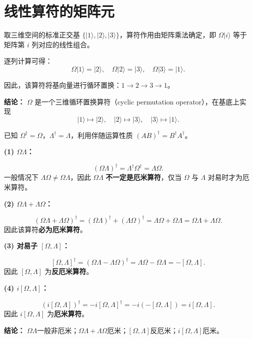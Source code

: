﻿%
\section{线性算符的矩阵元}

\begin{solution}[线性算符矩阵表示的作用]

\answer
取三维空间的标准正交基 $\{|1\rangle,|2\rangle,|3\rangle\}$，算符作用由矩阵乘法确定，即 $\Omega|i\rangle$ 等于矩阵第 $i$ 列对应的线性组合。

逐列计算可得：
\[
\Omega|1\rangle = |2\rangle,\quad \Omega|2\rangle = |3\rangle,\quad \Omega|3\rangle = |1\rangle.
\]

因此，该算符将基向量进行循环置换：$1\to2\to3\to1$。

\textbf{结论：}
$\Omega$ 是一个三维循环置换算符（cyclic permutation operator），在基底上实现
\[
|1\rangle\mapsto|2\rangle,\quad |2\rangle\mapsto|3\rangle,\quad |3\rangle\mapsto|1\rangle.
\]
\end{solution}


\begin{solution}[厄米算符的代数性质]

\answer
已知 $\Omega^\dagger=\Omega$，$\Lambda^\dagger=\Lambda$，利用伴随运算性质 $(AB)^\dagger=B^\dagger A^\dagger$。

\textbf{(1) $\Omega\Lambda$：}

\[
(\Omega\Lambda)^\dagger=\Lambda^\dagger \Omega^\dagger=\Lambda\Omega.
\]
一般情况下 $\Lambda\Omega\neq \Omega\Lambda$，因此 $\Omega\Lambda$ \textbf{不一定是厄米算符}，仅当 $\Omega$ 与 $\Lambda$ 对易时才为厄米算符。

\textbf{(2) $\Omega\Lambda+\Lambda\Omega$：}

\[
(\Omega\Lambda+\Lambda\Omega)^\dagger
=(\Omega\Lambda)^\dagger+(\Lambda\Omega)^\dagger
=\Lambda\Omega+\Omega\Lambda
=\Omega\Lambda+\Lambda\Omega.
\]
因此该算符\textbf{必为厄米算符}。

\textbf{(3) 对易子 $[\Omega,\Lambda]$：}

\[
[\Omega,\Lambda]^\dagger=(\Omega\Lambda-\Lambda\Omega)^\dagger
=\Lambda\Omega-\Omega\Lambda
=-[\Omega,\Lambda].
\]
因此 $[\Omega,\Lambda]$ 为\textbf{反厄米算符}。

\textbf{(4) $i[\Omega,\Lambda]$：}

\[
(i[\Omega,\Lambda])^\dagger
=-i[\Omega,\Lambda]^\dagger
=-i(-[\Omega,\Lambda])
=i[\Omega,\Lambda].
\]
因此 $i[\Omega,\Lambda]$ 为\textbf{厄米算符}。

\textbf{结论：}
$\Omega\Lambda$一般非厄米；$\Omega\Lambda+\Lambda\Omega$厄米；$[\Omega,\Lambda]$反厄米；$i[\Omega,\Lambda]$厄米。
\end{solution}


